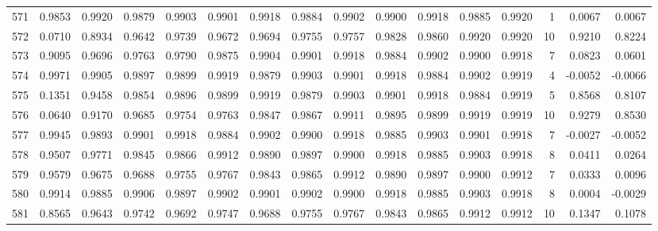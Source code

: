 \begin{tabular}{lrrrrrrrrrrrrrrr}
571 &      0.9853 &  0.9920 &  0.9879 &  0.9903 &  0.9901 &  0.9918 &  0.9884 &  0.9902 &  0.9900 &  0.9918 &   0.9885 &     0.9920 &      1 &                    0.0067 &                     0.0067 \\
572 &      0.0710 &  0.8934 &  0.9642 &  0.9739 &  0.9672 &  0.9694 &  0.9755 &  0.9757 &  0.9828 &  0.9860 &   0.9920 &     0.9920 &     10 &                    0.9210 &                     0.8224 \\
573 &      0.9095 &  0.9696 &  0.9763 &  0.9790 &  0.9875 &  0.9904 &  0.9901 &  0.9918 &  0.9884 &  0.9902 &   0.9900 &     0.9918 &      7 &                    0.0823 &                     0.0601 \\
574 &      0.9971 &  0.9905 &  0.9897 &  0.9899 &  0.9919 &  0.9879 &  0.9903 &  0.9901 &  0.9918 &  0.9884 &   0.9902 &     0.9919 &      4 &                   -0.0052 &                    -0.0066 \\
575 &      0.1351 &  0.9458 &  0.9854 &  0.9896 &  0.9899 &  0.9919 &  0.9879 &  0.9903 &  0.9901 &  0.9918 &   0.9884 &     0.9919 &      5 &                    0.8568 &                     0.8107 \\
576 &      0.0640 &  0.9170 &  0.9685 &  0.9754 &  0.9763 &  0.9847 &  0.9867 &  0.9911 &  0.9895 &  0.9899 &   0.9919 &     0.9919 &     10 &                    0.9279 &                     0.8530 \\
577 &      0.9945 &  0.9893 &  0.9901 &  0.9918 &  0.9884 &  0.9902 &  0.9900 &  0.9918 &  0.9885 &  0.9903 &   0.9901 &     0.9918 &      7 &                   -0.0027 &                    -0.0052 \\
578 &      0.9507 &  0.9771 &  0.9845 &  0.9866 &  0.9912 &  0.9890 &  0.9897 &  0.9900 &  0.9918 &  0.9885 &   0.9903 &     0.9918 &      8 &                    0.0411 &                     0.0264 \\
579 &      0.9579 &  0.9675 &  0.9688 &  0.9755 &  0.9767 &  0.9843 &  0.9865 &  0.9912 &  0.9890 &  0.9897 &   0.9900 &     0.9912 &      7 &                    0.0333 &                     0.0096 \\
580 &      0.9914 &  0.9885 &  0.9906 &  0.9897 &  0.9902 &  0.9901 &  0.9902 &  0.9900 &  0.9918 &  0.9885 &   0.9903 &     0.9918 &      8 &                    0.0004 &                    -0.0029 \\
581 &      0.8565 &  0.9643 &  0.9742 &  0.9692 &  0.9747 &  0.9688 &  0.9755 &  0.9767 &  0.9843 &  0.9865 &   0.9912 &     0.9912 &     10 &                    0.1347 &                     0.1078 \\

\end{tabular}
